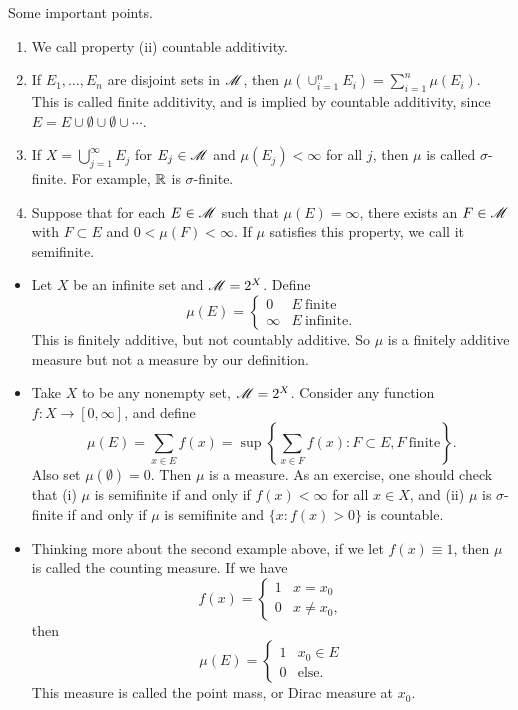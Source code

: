 \documentclass[12pt]{article} %
\begin{document}
\begin{remark}
    Some important points.
    \begin{enumerate}
        \item We call property (ii) countable additivity.
        \item If $E_1, \ldots, E_n$ are disjoint sets in $\mathscr{M}$, then $\mu\left(\cup_{i=1}^{n} E_i \right) = \sum_{i=1}^{n} \mu(E_i)$. This is called finite additivity, and is implied by countable additivity, since $E = E \cup \emptyset \cup \emptyset \cup \cdots$.
        \item If $X = \bigcup_{j=1}^{\infty} E_j$ for $E_j \in \mathscr{M}$ and $\mu(E_j) < \infty$ for all $j$, then $\mu$ is called $\sigma$-finite. For example, $\mathbb{R}$ is $\sigma$-finite.
        \item Suppose that for each $E \in \mathscr{M}$ such that $\mu(E) = \infty$, there exists an $F \in \mathscr{M}$ with $F \subset E$ and $0 < \mu(F) < \infty$. If $\mu$ satisfies this property, we call it semifinite.
    \end{enumerate}
\end{remark}

\begin{example}[Measures]
    \begin{itemize}
        \item Let $X$ be an infinite set and $\mathscr{M} = 2^X$. Define \[\mu(E) = \begin{cases}
            0 &E \ \text{finite}\\
            \infty &E \ \text{infinite}.
        \end{cases}\] This is finitely additive, but not countably additive. So $\mu$ is a finitely additive measure but not a measure by our definition.
        \item Take $X$ to be any nonempty set, $\mathscr{M} = 2^X$. Consider any function $f : X \to [0,\infty]$, and define \[\mu(E) = \sum_{x \in E} f(x) = \sup \left\{ \sum_{x \in F} f(x) : F \subset E, F \ \text{finite}\right\}.\] Also set $\mu(\emptyset) = 0$. Then $\mu$ is a measure. As an exercise, one should check that (i) $\mu$ is semifinite if and only if $f(x) < \infty$ for all $x \in X$, and (ii) $\mu$ is $\sigma$-finite if and only if $\mu$ is semifinite and $\{x : f(x) > 0\}$ is countable. 
        \item Thinking more about the second example above, if we let $f(x) \equiv 1$, then $\mu$ is called the counting measure. If we have \[f(x) = \begin{cases}
            1 &x = x_0\\
            0 &x \neq x_0,
        \end{cases}\] then \[\mu(E) = \begin{cases}
            1 &x_0 \in E\\
            0 &\text{else}.
        \end{cases}\] This measure is called the point mass, or Dirac measure at $x_0$.
    \end{itemize}
\end{example}
\end{document}
